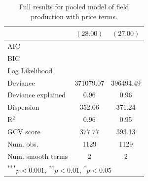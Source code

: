 \documentclass[11pt]{article}
\begin{document}
\begin{spacing}{1}
\begin{table}
\begin{center}
\begin{tabular}{l c c }
                                     & $(28.00)$        & $(27.00)$        \\
\hline
AIC                                  &                  &                  \\
BIC                                  &                  &                  \\
Log Likelihood                       &                  &                  \\
Deviance                             & 371079.07        & 396494.49        \\
Deviance explained                   & 0.96             & 0.96             \\
Dispersion                           & 352.06           & 371.24           \\
R$^2$                                & 0.96             & 0.95             \\
GCV score                            & 377.77           & 393.13           \\
Num. obs.                            & 1129             & 1129             \\
Num. smooth terms                    & 2                & 2                \\
\hline
\multicolumn{3}{l}{\scriptsize{\textsuperscript{***}$p<0.001$, 
  \textsuperscript{**}$p<0.01$, 
  \textsuperscript{*}$p<0.05$}}
\end{tabular}
\caption{Full results for pooled model of field production with price terms.}
\label{table:pooled}
\end{center}
\end{table} 




\end{spacing}
\end{document}
